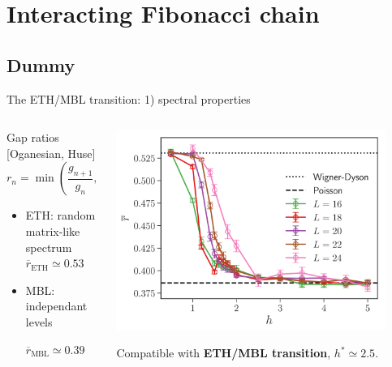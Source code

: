 \section{Interacting Fibonacci chain}
\subsection{Dummy}
\begin{frame}{The ETH/MBL transition: 1) spectral properties}
\begin{columns}
\begin{column}{0.5\textwidth}
Gap ratios {\footnotesize [Oganesian, Huse]}
\[
	r_n = \min\left(\frac{g_{n+1}}{g_n}, \frac{g_n}{g_{n+1}}\right)
\]
\begin{itemize}
	\item ETH: random matrix-like spectrum
	$\overline{r}_\text{ETH} \simeq 0.53$
	\item MBL: independant levels
	
	$\overline{r}_\text{MBL} \simeq 0.39$
\end{itemize}
\end{column}
\begin{column}{0.5\textwidth}
\centering
\includegraphics[width=0.9\textwidth]{img/3_Fibonacci/rgap}

Compatible with \textbf{ETH/MBL transition}, $h^* \simeq 2.5$.
\end{column}
\end{columns}
\end{frame}

